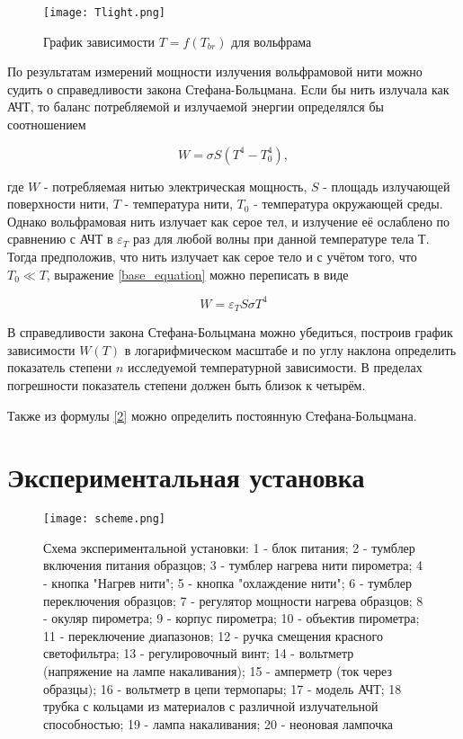 	\begin{figure}[h]
		\centering
		\texttt{[image: Tlight.png]}
		\caption{График зависимости $T = f(T_{br})$ для вольфрама}
		\label{fig:vac}
	\end{figure}

	По результатам измерений мощности излучения вольфрамовой нити можно судить о справедливости закона Стефана-Больцмана. Если бы нить излучала как АЧТ, то баланс потребляемой и излучаемой энергии определялся бы соотношением 
	
	\begin{equation} \label{base_equation}
		W = \sigma S (T^4 - T_0^4),
	\end{equation}

	где $W$ - потребляемая нитью электрическая мощность, $S$ - площадь излучающей поверхности нити, $T$ - температура нити, $T_0$ - температура окружающей среды. Однако вольфрамовая нить излучает как серое тел, и излучение её ослаблено по сравнению с АЧТ в $\varepsilon_T$ раз для любой волны при данной температуре тела Т. Тогда предположив, что нить излучает как серое тело и с учётом того, что $T_0 \ll T$, выражение \eqref{base_equation} можно переписать в виде
	
	\begin{equation} \label{2}
		W = \varepsilon_T S \sigma T^4
	\end{equation}

	В справедливости закона Стефана-Больцмана можно убедиться, построив график зависимости $W(T)$ в логарифмическом масштабе и по углу наклона определить показатель степени $n$ исследуемой температурной зависимости. В пределах погрешности показатель степени должен быть близок к четырём. \par
	Также из формулы \eqref{2} можно определить постоянную Стефана-Больцмана.

	\section*{Экспериментальная установка}

	\begin{figure}[h]
		\centering
		\texttt{[image: scheme.png]}
		\caption{Схема экспериментальной установки: 1 - блок питания; 2 - тумблер включения питания образцов; 3 - тумблер нагрева нити пирометра; 4 - кнопка "Нагрев нити"; 5 - кнопка "охлаждение нити"; 6 - тумблер переключения образцов; 7 - регулятор мощности нагрева образцов; 8 - окуляр пирометра; 9 - корпус пирометра; 10 - объектив пирометра; 11 - переключение диапазонов; 12 - ручка смещения красного светофильтра; 13 - регулировочный винт; 14 - вольтметр (напряжение на лампе накаливания); 15 - амперметр (ток через образцы); 16 - вольтметр в цепи термопары; 17 - модель АЧТ; 18 трубка с кольцами из материалов с различной излучательной способностью; 19 - лампа накаливания; 20 - неоновая лампочка}
		\label{fig:scheme}
	\end{figure}


